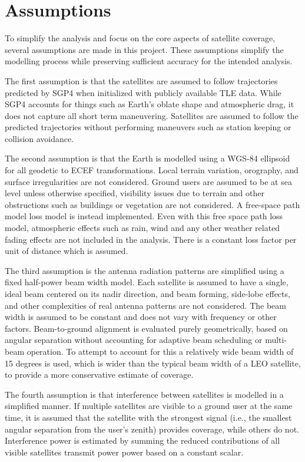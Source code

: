 \FloatBarrier
\section{Assumptions}
To simplify the analysis and focus on the core aspects of satellite coverage, several assumptions are made in this project. These assumptions simplify the modelling process while preserving sufficient accuracy for the intended analysis. 

The first assumption is that the satellites are assumed to follow trajectories predicted by SGP4 when initialized with publicly available TLE data. While SGP4 accounts for things such as Earth's oblate shape and atmospheric drag, it does not capture all short term maneuvering. Satellites are assumed to follow the predicted trajectories without performing maneuvers such as station keeping or collision avoidance. 

The second assumption is that the Earth is modelled using a WGS-84 ellipsoid for all geodetic to ECEF transformations. Local terrain variation, orography, and surface irregularities  are not considered. Ground users are assumed to be at sea level unless otherwise specified, visibility issues due to terrain and other obstructions such as buildings or vegetation are not considered. A free-space path model loss model is instead implemented. Even with this free space path loss model, atmospheric effects such as rain, wind and any other weather related fading effects are not included in the analysis. There is a constant loss factor per unit of distance which is assumed. 

The third assumption is the antenna radiation patterns are simplified using a fixed half-power beam width model. Each satellite is assumed to have a single, ideal beam centered on its nadir direction, and beam forming, side-lobe effects, and other complexities of real antenna patterns are not considered. The beam width is assumed to be constant and does not vary with frequency or other factors. Beam-to-ground alignment is evaluated purely geometrically, based on angular separation without accounting for adaptive beam scheduling or multi-beam operation. To attempt to account for this a relatively wide beam width of 15 degrees is used, which is wider than the typical beam width of a LEO satellite, to provide a more conservative estimate of coverage.

The fourth assumption is that interference between satellites is modelled in a simplified manner. If multiple satellites are visible to a ground user at the same time, it is assumed that the satellite with the strongest signal (i.e., the smallest angular separation from the user's zenith) provides coverage, while others do not. Interference power is estimated by summing the reduced contributions of all visible satellites transmit power power based on a constant scalar.  

